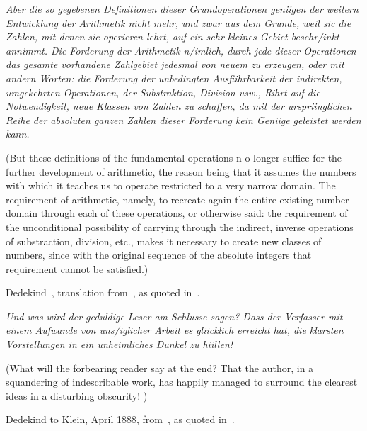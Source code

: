 \setcounter{currentlevel}{\value{baseSectionLevel}}
\label{sec:Numbers}

\epigraph{
\textsl{Aber die so gegebenen Definitionen dieser Grundoperationen
geniigen der weitern Entwicklung der Arithmetik nicht mehr, 
und zwar aus dem Grunde, weil sic
die Zahlen, mit denen sic operieren lehrt, auf ein sehr kleines 
Gebiet beschr/inkt annimmt. Die
Forderung der Arithmetik n/imlich, durch jede dieser Operationen 
das gesamte vorhandene Zahlgebiet
jedesmal von neuem zu erzeugen, oder mit andern Worten: 
die Forderung der unbedingten
Ausfiihrbarkeit der indirekten, umgekehrten Operationen, 
der Substraktion, Division usw., Rihrt
auf die Notwendigkeit, neue Klassen von Zahlen zu schaffen, 
da mit der urspriinglichen Reihe
der absoluten ganzen Zahlen 
dieser Forderung kein Geniige geleistet werden kann.}
\par
(But these definitions of the fundamental operations n
o longer suffice for the further development
of arithmetic, the reason being that it assumes the numbers with 
which it teaches us
to operate restricted to a very narrow domain. The requirement of 
arithmetic, namely, to
recreate again the entire existing number-domain through each 
of these operations, or otherwise
said: the requirement of the unconditional possibility 
of carrying through the indirect,
inverse operations of substraction, division, etc., 
makes it necessary to create new classes of
numbers, since with the original sequence 
of the absolute integers that requirement cannot be
satisfied.)}%
{Dedekind~\cite{Dedekind:1854}, 
translation from~\cite{Ewald2005KantToHilbert},
as quoted in~\cite{Ferreiros:2007:Labyrinth}.}

\epigraph{
\textsl{Und was wird der geduldige Leser am
Schlusse sagen? Dass der Verfasser mit einem Aufwande von uns/iglicher Arbeit es gliicklich
erreicht hat, die klarsten Vorstellungen in ein unheimliches Dunkel zu hiillen!}
\par
(What will the forbearing reader say at the end? That the author, in a squandering of indescribable
work, has happily managed to surround the clearest ideas in a disturbing obscurity!
)}%
{Dedekind to Klein, April 1888, 
from~\cite{dugac1976DedekindFondements},
as quoted in~\cite{Ferreiros:2007:Labyrinth}.}


% 


